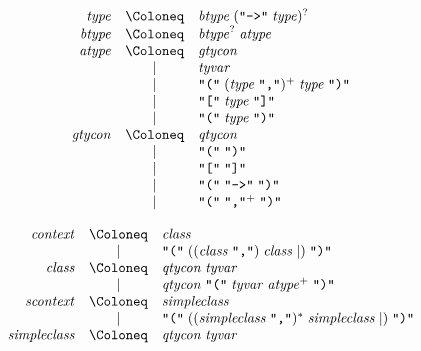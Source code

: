\begin{align*}
  \begin{array}{rcl}
    \mathit{type}
    & \Coloneq & \mathit{btype}\; (\text{\texttt{\textquotedbl ->\textquotedbl}}\; \mathit{type})^? \\
    \mathit{btype}
    & \Coloneq & \mathit{btype}^?\; \mathit{atype} \\
    \mathit{atype}
    & \Coloneq & \mathit{gtycon} \\
    & \mid & \mathit{tyvar} \\
    & \mid & \text{\texttt{\textquotedbl(\textquotedbl}}\; (\mathit{type}\; \text{\texttt{\textquotedbl,\textquotedbl}})^+\; \mathit{type}\; \text{\texttt{\textquotedbl)\textquotedbl}} \\
    & \mid & \text{\texttt{\textquotedbl[\textquotedbl}}\; \mathit{type}\; \text{\texttt{\textquotedbl]\textquotedbl}} \\
    & \mid & \text{\texttt{\textquotedbl(\textquotedbl}}\; \mathit{type}\; \text{\texttt{\textquotedbl)\textquotedbl}} \\
    \mathit{gtycon}
    & \Coloneq & \mathit{qtycon} \\
    & \mid & \text{\texttt{\textquotedbl(\textquotedbl}}\; \text{\texttt{\textquotedbl)\textquotedbl}} \\
    & \mid & \text{\texttt{\textquotedbl[\textquotedbl}}\; \text{\texttt{\textquotedbl]\textquotedbl}} \\
    & \mid & \text{\texttt{\textquotedbl(\textquotedbl}}\; \text{\texttt{\textquotedbl ->\textquotedbl}}\; \text{\texttt{\textquotedbl)\textquotedbl}} \\
    & \mid & \text{\texttt{\textquotedbl(\textquotedbl}}\; \text{\texttt{\textquotedbl,\textquotedbl}}^+\; \text{\texttt{\textquotedbl)\textquotedbl}}
  \end{array}
\end{align*}

\begin{align*}
  \begin{array}{rcl}
    \mathit{context}
    & \Coloneq & \mathit{class} \\
    & \mid & \text{\texttt{\textquotedbl(\textquotedbl}}\; ((\mathit{class}\; \text{\texttt{\textquotedbl,\textquotedbl}})\; \mathit{class} \mid )\; \text{\texttt{\textquotedbl)\textquotedbl}}
    \\
    \mathit{class}
    & \Coloneq & \mathit{qtycon}\; \mathit{tyvar} \\
    & \mid & \mathit{qtycon}\; \text{\texttt{\textquotedbl(\textquotedbl}}\; \mathit{tyvar}\; \mathit{atype}^+\; \text{\texttt{\textquotedbl)\textquotedbl}} \\
    \mathit{scontext}
    & \Coloneq & \mathit{simpleclass} \\
    & \mid & \text{\texttt{\textquotedbl(\textquotedbl}}\; ((\mathit{simpleclass}\; \text{\texttt{\textquotedbl,\textquotedbl}})^*\; \mathit{simpleclass} \mid )\; \text{\texttt{\textquotedbl)\textquotedbl}}
    \\
    \mathit{simpleclass}
    & \Coloneq & \mathit{qtycon}\; \mathit{tyvar}
  \end{array}
\end{align*}

